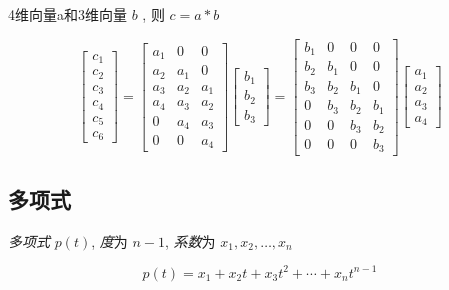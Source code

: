 \begin{example}
    4维向量a和3维向量 $ b $ ,  则 $ c=a * b $

$$
\left[\begin{array}{l}
c_{1} \\
c_{2} \\
c_{3} \\
c_{4} \\
c_{5} \\
c_{6}
\end{array}\right]=\left[\begin{array}{lll}
a_{1} & 0 & 0 \\
a_{2} & a_{1} & 0 \\
a_{3} & a_{2} & a_{1} \\
a_{4} & a_{3} & a_{2} \\
0 & a_{4} & a_{3} \\
0 & 0 & a_{4}
\end{array}\right]\left[\begin{array}{l}
b_{1} \\
b_{2} \\
b_{3}
\end{array}\right]=\left[\begin{array}{cccc}
b_{1} & 0 & 0 & 0 \\
b_{2} & b_{1} & 0 & 0 \\
b_{3} & b_{2} & b_{1} & 0 \\
0 & b_{3} & b_{2} & b_{1} \\
0 & 0 & b_{3} & b_{2} \\
0 & 0 & 0 & b_{3}
\end{array}\right]\left[\begin{array}{l}
a_{1} \\
a_{2} \\
a_{3} \\
a_{4}
\end{array}\right]
$$
\end{example}

\subsection{多项式}

\begin{definition}[多项式]
    \textit{多项式} $ p(t) $, \textit{度}为 $ n-1 $, \textit{系数}为 $ x_{1}, x_{2}, \ldots, x_{n} $

    $$
p(t)=x_{1}+x_{2} t+x_{3} t^{2}+\cdots+x_{n} t^{n-1}
$$
\end{definition}

